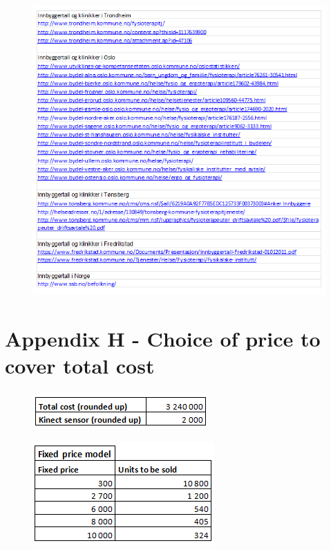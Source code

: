 \begin{figure}
\begin{center}
\includegraphics[scale=0.8]{kilder}
\label{fig:sources}
\end{center}
\end{figure}

\newpage
\section*{Appendix H - Choice of price to cover total cost}
\label{H}

\begin{figure}[h!]
\begin{center}
\includegraphics[scale=0.8]{grunn}
\label{fig:Assump}
\end{center}
\end{figure}

\begin{figure}
\begin{center}
\includegraphics[scale=0.8]{fixedpricequantity}
\label{fig:fixedPQ}
\end{center}
\end{figure}

